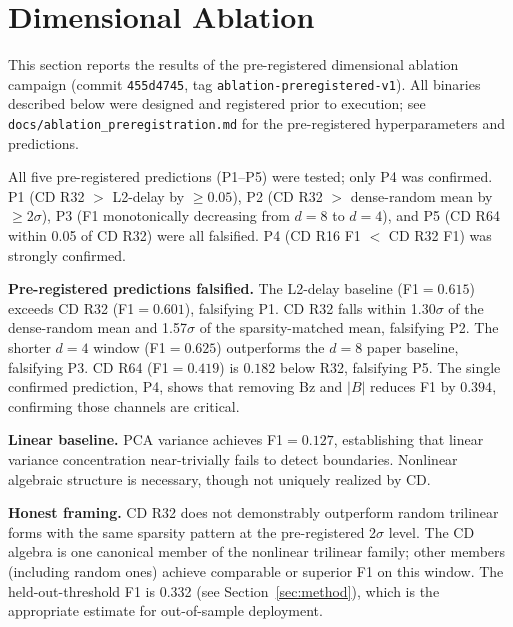 \documentclass[draft]{agujournal2025}
\begin{document}
\section{Dimensional Ablation}
\label{sec:dimensional_ablation}

This section reports the results of the pre-registered dimensional ablation
campaign (commit \texttt{455d4745}, tag \texttt{ablation-preregistered-v1}).
All binaries described below were designed and registered prior to execution;
see \texttt{docs/ablation\_preregistration.md} for the pre-registered
hyperparameters and predictions.

All five pre-registered predictions (P1--P5) were tested; only P4 was confirmed.
P1 (CD R32 $>$ L2-delay by $\geq 0.05$), P2 (CD R32 $>$ dense-random mean
by $\geq 2\sigma$), P3 (F1 monotonically decreasing from $d=8$ to $d=4$),
and P5 (CD R64 within 0.05 of CD R32) were all falsified.
P4 (CD R16 F1 $<$ CD R32 F1) was strongly confirmed.

\textbf{Pre-registered predictions falsified.}  The L2-delay baseline
(F1$=0.615$) exceeds CD R32 (F1$=0.601$), falsifying P1.  CD R32 falls within
1.30$\sigma$ of the dense-random mean and 1.57$\sigma$ of the sparsity-matched
mean, falsifying P2.  The shorter $d=4$ window (F1$=0.625$) outperforms the
$d=8$ paper baseline, falsifying P3.  CD R64 (F1$=0.419$) is $0.182$ below R32,
falsifying P5.  The single confirmed prediction, P4, shows that removing Bz
and $|B|$ reduces F1 by $0.394$, confirming those channels are critical.

\textbf{Linear baseline.}  PCA variance achieves F1$=0.127$, establishing that
linear variance concentration near-trivially fails to detect boundaries.
Nonlinear algebraic structure is necessary, though not uniquely realized by CD.

\textbf{Honest framing.}  CD R32 does not demonstrably outperform random trilinear
forms with the same sparsity pattern at the pre-registered 2$\sigma$ level.
The CD algebra is one canonical member of the nonlinear trilinear family; other
members (including random ones) achieve comparable or superior F1 on this window.
The held-out-threshold F1 is 0.332 (see Section~\ref{sec:method}), which is the
appropriate estimate for out-of-sample deployment.
\end{document}
